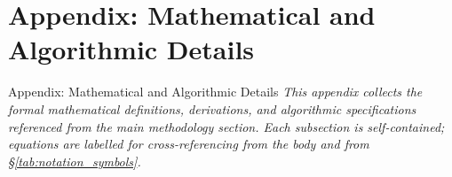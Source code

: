 \documentclass[
  ignorenonframetext,
]{beamer}
\author{\texorpdfstring{}{}}
\date{}
\begin{document}
\section{\texorpdfstring{Appendix: Mathematical and Algorithmic Details
\label{sec:technical_appendix}}{Appendix: Mathematical and Algorithmic Details }}\label{appendix-mathematical-and-algorithmic-details}

\begin{frame}[allowframebreaks]{Appendix: Mathematical and Algorithmic
Details \label{sec:technical_appendix}}
\emph{This appendix collects the formal mathematical definitions,
derivations, and algorithmic specifications referenced from the main
methodology section. Each subsection is self-contained; equations are
labelled for cross-referencing from the body and from
\S\ref{tab:notation_symbols}.}
\end{frame}
\end{document}
